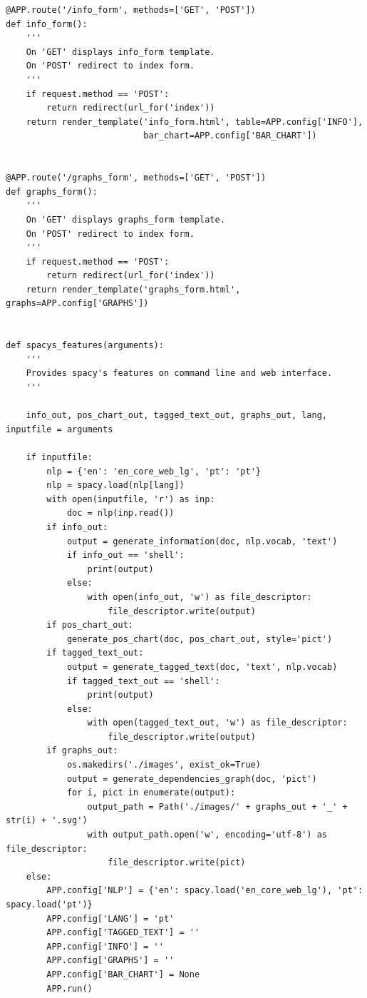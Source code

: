 \documentclass[12pt]{article}
\begin{document}
\begin{verbatim}
@APP.route('/info_form', methods=['GET', 'POST'])
def info_form():
    '''
    On 'GET' displays info_form template.
    On 'POST' redirect to index form.
    '''
    if request.method == 'POST':
        return redirect(url_for('index'))
    return render_template('info_form.html', table=APP.config['INFO'],
                           bar_chart=APP.config['BAR_CHART'])


@APP.route('/graphs_form', methods=['GET', 'POST'])
def graphs_form():
    '''
    On 'GET' displays graphs_form template.
    On 'POST' redirect to index form.
    '''
    if request.method == 'POST':
        return redirect(url_for('index'))
    return render_template('graphs_form.html', graphs=APP.config['GRAPHS'])


def spacys_features(arguments):
    '''
    Provides spacy's features on command line and web interface.
    '''

    info_out, pos_chart_out, tagged_text_out, graphs_out, lang, inputfile = arguments

    if inputfile:
        nlp = {'en': 'en_core_web_lg', 'pt': 'pt'}
        nlp = spacy.load(nlp[lang])
        with open(inputfile, 'r') as inp:
            doc = nlp(inp.read())
        if info_out:
            output = generate_information(doc, nlp.vocab, 'text')
            if info_out == 'shell':
                print(output)
            else:
                with open(info_out, 'w') as file_descriptor:
                    file_descriptor.write(output)
        if pos_chart_out:
            generate_pos_chart(doc, pos_chart_out, style='pict')
        if tagged_text_out:
            output = generate_tagged_text(doc, 'text', nlp.vocab)
            if tagged_text_out == 'shell':
                print(output)
            else:
                with open(tagged_text_out, 'w') as file_descriptor:
                    file_descriptor.write(output)
        if graphs_out:
            os.makedirs('./images', exist_ok=True)
            output = generate_dependencies_graph(doc, 'pict')
            for i, pict in enumerate(output):
                output_path = Path('./images/' + graphs_out + '_' + str(i) + '.svg')
                with output_path.open('w', encoding='utf-8') as file_descriptor:
                    file_descriptor.write(pict)
    else:
        APP.config['NLP'] = {'en': spacy.load('en_core_web_lg'), 'pt': spacy.load('pt')}
        APP.config['LANG'] = 'pt'
        APP.config['TAGGED_TEXT'] = ''
        APP.config['INFO'] = ''
        APP.config['GRAPHS'] = ''
        APP.config['BAR_CHART'] = None
        APP.run()




\end{verbatim}
\end{document}
